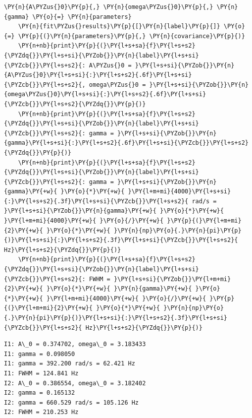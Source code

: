 \begin{tcolorbox}[breakable, size=fbox, boxrule=1pt, pad at break*=1mm,colback=cellbackground, colframe=cellborder]
\begin{Verbatim}[commandchars=\\\{\}]
    \PY{n}{A\PYZus{}0}\PY{p}{,} \PY{n}{omega\PYZus{}0}\PY{p}{,} \PY{n}{gamma} \PY{o}{=} \PY{n}{parameters}
    \PY{n}{fit\PYZus{}results}\PY{p}{[}\PY{n}{label}\PY{p}{]} \PY{o}{=} \PY{p}{(}\PY{n}{parameters}\PY{p}{,} \PY{n}{covariance}\PY{p}{)}
    \PY{n+nb}{print}\PY{p}{(}\PY{l+s+sa}{f}\PY{l+s+s2}{\PYZdq{}}\PY{l+s+si}{\PYZob{}}\PY{n}{label}\PY{l+s+si}{\PYZcb{}}\PY{l+s+s2}{: A\PYZus{}0 = }\PY{l+s+si}{\PYZob{}}\PY{n}{A\PYZus{}0}\PY{l+s+si}{:}\PY{l+s+s2}{.6f}\PY{l+s+si}{\PYZcb{}}\PY{l+s+s2}{, omega\PYZus{}0 = }\PY{l+s+si}{\PYZob{}}\PY{n}{omega\PYZus{}0}\PY{l+s+si}{:}\PY{l+s+s2}{.6f}\PY{l+s+si}{\PYZcb{}}\PY{l+s+s2}{\PYZdq{}}\PY{p}{)}
    \PY{n+nb}{print}\PY{p}{(}\PY{l+s+sa}{f}\PY{l+s+s2}{\PYZdq{}}\PY{l+s+si}{\PYZob{}}\PY{n}{label}\PY{l+s+si}{\PYZcb{}}\PY{l+s+s2}{: gamma = }\PY{l+s+si}{\PYZob{}}\PY{n}{gamma}\PY{l+s+si}{:}\PY{l+s+s2}{.6f}\PY{l+s+si}{\PYZcb{}}\PY{l+s+s2}{\PYZdq{}}\PY{p}{)}
    \PY{n+nb}{print}\PY{p}{(}\PY{l+s+sa}{f}\PY{l+s+s2}{\PYZdq{}}\PY{l+s+si}{\PYZob{}}\PY{n}{label}\PY{l+s+si}{\PYZcb{}}\PY{l+s+s2}{: gamma = }\PY{l+s+si}{\PYZob{}}\PY{n}{gamma}\PY{+w}{ }\PY{o}{*}\PY{+w}{ }\PY{l+m+mi}{4000}\PY{l+s+si}{:}\PY{l+s+s2}{.3f}\PY{l+s+si}{\PYZcb{}}\PY{l+s+s2}{ rad/s = }\PY{l+s+si}{\PYZob{}}\PY{n}{gamma}\PY{+w}{ }\PY{o}{*}\PY{+w}{ }\PY{l+m+mi}{4000}\PY{+w}{ }\PY{o}{/}\PY{+w}{ }\PY{p}{(}\PY{l+m+mi}{2}\PY{+w}{ }\PY{o}{*}\PY{+w}{ }\PY{n}{np}\PY{o}{.}\PY{n}{pi}\PY{p}{)}\PY{l+s+si}{:}\PY{l+s+s2}{.3f}\PY{l+s+si}{\PYZcb{}}\PY{l+s+s2}{ Hz}\PY{l+s+s2}{\PYZdq{}}\PY{p}{)}
    \PY{n+nb}{print}\PY{p}{(}\PY{l+s+sa}{f}\PY{l+s+s2}{\PYZdq{}}\PY{l+s+si}{\PYZob{}}\PY{n}{label}\PY{l+s+si}{\PYZcb{}}\PY{l+s+s2}{: FWHM = }\PY{l+s+si}{\PYZob{}}\PY{l+m+mi}{2}\PY{+w}{ }\PY{o}{*}\PY{+w}{ }\PY{n}{gamma}\PY{+w}{ }\PY{o}{*}\PY{+w}{ }\PY{l+m+mi}{4000}\PY{+w}{ }\PY{o}{/}\PY{+w}{ }\PY{p}{(}\PY{l+m+mi}{2}\PY{+w}{ }\PY{o}{*}\PY{+w}{ }\PY{n}{np}\PY{o}{.}\PY{n}{pi}\PY{p}{)}\PY{l+s+si}{:}\PY{l+s+s2}{.3f}\PY{l+s+si}{\PYZcb{}}\PY{l+s+s2}{ Hz}\PY{l+s+s2}{\PYZdq{}}\PY{p}{)}
\end{Verbatim}
\end{tcolorbox}

    \begin{Verbatim}[commandchars=\\\{\}]
I1: A\_0 = 0.374702, omega\_0 = 3.183433
I1: gamma = 0.098050
I1: gamma = 392.200 rad/s = 62.421 Hz
I1: FWHM = 124.841 Hz
I2: A\_0 = 0.386554, omega\_0 = 3.182402
I2: gamma = 0.165132
I2: gamma = 660.529 rad/s = 105.126 Hz
I2: FWHM = 210.253 Hz
    \end{Verbatim}

